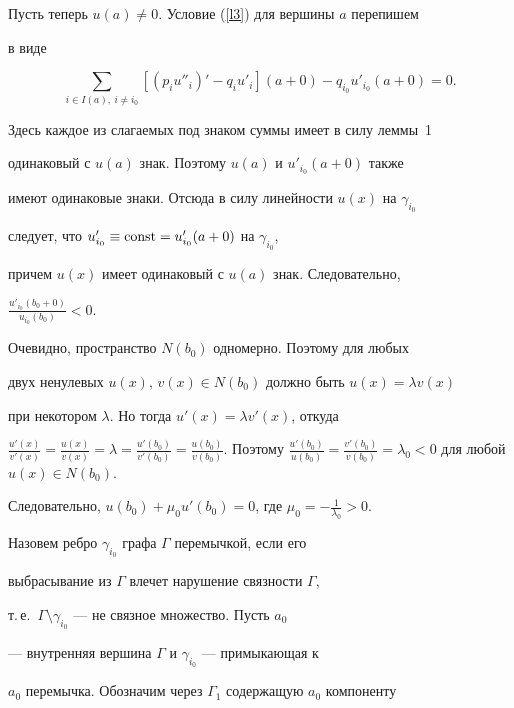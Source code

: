 {{{{{{{\begin{pf}
Пусть теперь $u(a)\not =0$. Условие (\ref{l3}) для вершины $a$ перепишем


в виде


$$


\sum_{i \in I(a),\ i \ne i_0}[(p_iu''_{i})'-q_iu'_{i}]


(a+0)-q_{i_0}u'_{i_0}(a+0)=0.


$$





Здесь каждое из слагаемых под знаком суммы имеет в силу леммы~1


одинаковый с $u(a)$ знак. Поэтому $u(a)$ и $u'_{i_0}(a+0)$ также


имеют одинаковые знаки. Отсюда в силу линейности $u(x)$ на $\gamma_{i_0}$


следует, что $u'_{i_0}\equiv \operatorname{const}=u'_{i_0}(a+0)$ на $\gamma_{i_0}$,


причем $u(x)$ имеет одинаковый с $u(a)$ знак. Следовательно,


$\frac{u'_{i_0}(b_0+0)}{u_{i_0}(b_0)}<0$.





Очевидно, пространство $N(b_0)$ одномерно. Поэтому для любых


двух ненулевых $u(x),\, v(x) \in N(b_0)$ должно быть $u(x)=\lambda v(x)$


при некотором $\lambda$. Но тогда $u'(x)=\lambda v'(x)$, откуда


$\frac{u'(x)}{v'(x)}=\frac{u(x)}{v(x)}=\lambda=\frac{u'(b_0)}{v'(b_0)}=


\frac{u(b_0)}{v(b_0)}$. Поэтому $\frac{u'(b_0)}{u(b_0)}=


\frac{v'(b_0)}{v(b_0)}=\lambda_0<0$ для любой $u(x) \in N(b_0)$.


Следовательно, $u(b_0)+\mu_0 u'(b_0)=0$, где $\mu_0=-\frac{1}{\lambda_0}>0$.


\end{pf}





Назовем ребро $\gamma_{i_0}$ графа $\Gamma$ перемычкой, если его


выбрасывание из $\Gamma$ влечет нарушение связности $\Gamma$,


т.\,е.~$\Gamma\setminus \gamma_{i_0}$ --- не связное множество. Пусть $a_0$


--- внутренняя вершина $\Gamma$ и $\gamma_{i_0}$ --- примыкающая к


$a_0$ перемычка. Обозначим через $\Gamma_1$ содержащую $a_0$ компоненту


}}}}}}}
